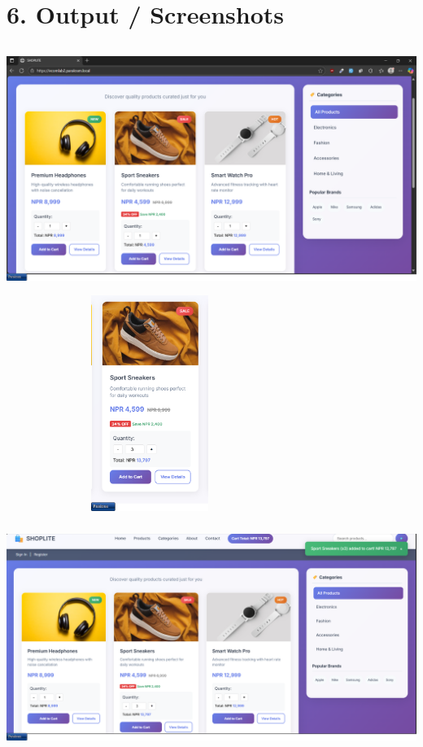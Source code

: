 \documentclass[a4paper,12pt]{article}
\begin{document}
\section*{6. Output / Screenshots}
\begin{center}
  \includegraphics[width=\textwidth,height=8cm,keepaspectratio]{images/output1.png}
  \includegraphics[width=0.7\textwidth, height=7cm, keepaspectratio]{images/output2.png}
  \includegraphics[width=\textwidth,height=8cm,keepaspectratio]{images/output3.png}

\end{center}
\end{document}
